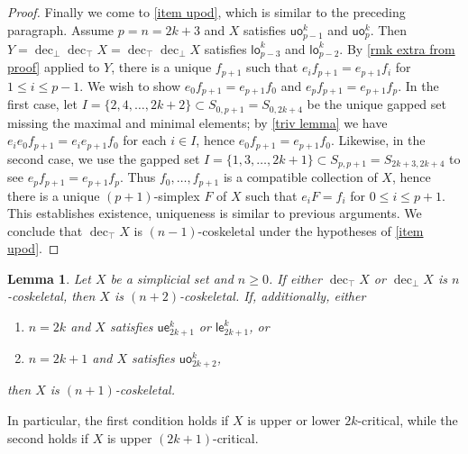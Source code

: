 \documentclass{amsart}
\newcommand{\lowev}{\mathsf{le}}
\newcommand{\lowod}{\mathsf{lo}}
\newcommand{\uppev}{\mathsf{ue}}
\newcommand{\uppod}{\mathsf{uo}}
\newcommand{\decbot}{\operatorname{dec}_\bot}
\newcommand{\dectop}{\operatorname{dec}_\top}
\newtheorem{lemma}[theorem]{Lemma}
\theoremstyle{definition}
\theoremstyle{remark}
\begin{document}
\begin{proof}
Finally we come to \eqref{item upod}, which is similar to the preceding paragraph.
Assume $p=n = 2k+3$ and $X$ satisfies $\uppod_{p-1}^k$ and $\uppod_p^k$.
Then $Y = \decbot \dectop X = \dectop\decbot X$ satisfies $\lowod_{p-3}^k$ and $\lowod_{p-2}^k$.
By \cref{rmk extra from proof} applied to $Y$, there is a unique $f_{p+1}$ such that $e_i f_{p+1} = e_{p+1} f_i$ for $1\leq i \leq p-1$.
We wish to show $e_0 f_{p+1} = e_{p+1} f_0$ and $e_p f_{p+1} = e_{p+1} f_p$.
In the first case, let $I = \{2, 4, \dots, 2k+2\} \subset S_{0,p+1} = S_{0,2k+4}$ be the unique gapped set missing the maximal and minimal elements; 
by \cref{triv lemma} we have $e_i e_0 f_{p+1} = e_i e_{p+1} f_0$ for each $i\in I$, hence $e_0 f_{p+1} = e_{p+1} f_0$.
Likewise, in the second case, we use the gapped set $I = \{1,3, \dots, 2k+1\} \subset S_{p,p+1} = S_{2k+3,2k+4}$ to see $e_p f_{p+1} = e_{p+1} f_p$.
Thus $f_0, \dots, f_{p+1}$ is a compatible collection of $X$, hence there is a unique $(p+1)$-simplex $F$ of $X$ such that $e_i F = f_i$ for $0\leq i \leq p+1$.
This establishes existence, uniqueness is similar to previous arguments.
We conclude that $\dectop X$ is $(n{-}1)$-coskeletal under the hypotheses of \eqref{item upod}.
\end{proof}


\begin{lemma}\label{lem dec coskel to coskel}
Let $X$ be a simplicial set and $n \geq 0$. 
If either $\dectop X$ or $\decbot X$ is $n$-coskeletal, then $X$ is $(n{+}2)$-coskeletal.
If, additionally, either 
\begin{enumerate}
\item $n=2k$ and $X$ satisfies $\uppev_{2k+1}^k$ or $\lowev_{2k+1}^k$, or
\item $n=2k+1$ and $X$ satisfies $\uppod_{2k+2}^k$,
\end{enumerate}
then $X$ is $(n{+}1)$-coskeletal.
\end{lemma}
In particular, the first condition holds if $X$ is upper or lower $2k$-critical, while the second holds if $X$ is upper $(2k{+}1)$-critical.
\end{document}
